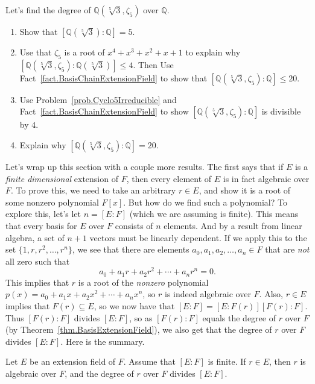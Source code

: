 
\begin{problem}\label{prob.DegreeQFifthRoot3AndZeta5}
Let's find the degree of $\mathbb{Q}(\sqrt[5]{3},\zeta_5)$ over $\mathbb{Q}$.
\begin{enumerate}
\item Show that $[\mathbb{Q}(\sqrt[5]{3}):\mathbb{Q}] = 5$.
\item Use that $\zeta_5$ is a root of $x^4+x^3+x^2+x+1$ to explain why $[\mathbb{Q}(\sqrt[5]{3},\zeta_5):\mathbb{Q}(\sqrt[5]{3})] \le 4$. Then Use Fact~\ref{fact.BasisChainExtensionField} to show that $[\mathbb{Q}(\sqrt[5]{3},\zeta_5):\mathbb{Q}]\le 20$.
\item Use Problem~\ref{prob.Cyclo5Irreducible} and Fact~\ref{fact.BasisChainExtensionField}  to show $[\mathbb{Q}(\sqrt[5]{3},\zeta_5):\mathbb{Q}]$ is divisible by $4$.
\item Explain why $[\mathbb{Q}(\sqrt[5]{3},\zeta_5):\mathbb{Q}]= 20.$
\end{enumerate}
\end{problem}

Let's wrap up this section with a couple more results. The first says that if $E$ is a \emph{finite dimensional} extension of $F$, then every element of $E$ is in fact algebraic over $F$. To prove this, we need to take an arbitrary $r\in E$, and show it is a root of some nonzero polynomial $F[x]$. But how do we find such a polynomial? To explore this, let's let $n= [E:F]$ (which we are assuming is finite). This means that every basis for $E$ over $F$ consists of $n$ elements. And by a result from  linear algebra, a set of $n+1$ vectors must be linearly dependent. If we apply this to the set $\{1,r,r^2,\ldots,r^n\}$, we see that there are elements $a_0,a_1,a_2,\ldots,a_n\in F$ that are \emph{not} all zero such that \[a_0+a_1r+a_2r^2+\cdots+a_nr^n = 0.\]
This implies that $r$ is a root of the \emph{nonzero} polynomial $p(x) = a_0+a_1x+a_2x^2+\cdots+a_nx^n$, so $r$ is indeed algebraic over $F$. Also, $r\in E$ implies that $F(r)\subseteq E$, so we now have that $[E:F] = [E:F(r)][F(r):F]$. Thus $[F(r):F]$ divides $[E:F]$, so as $[F(r):F]$ equals the degree of $r$ over $F$ (by Theorem~\ref{thm.BasisExtensionField}), we also get that the degree of $r$ over $F$ divides $[E:F]$. Here is the summary.

\begin{fact}
Let $E$ be an extension field of $F$. Assume that $[E:F]$ is finite. If $r\in E$, then $r$ is algebraic over $F$, and the degree of $r$ over $F$ divides $[E:F]$.
\end{fact}

